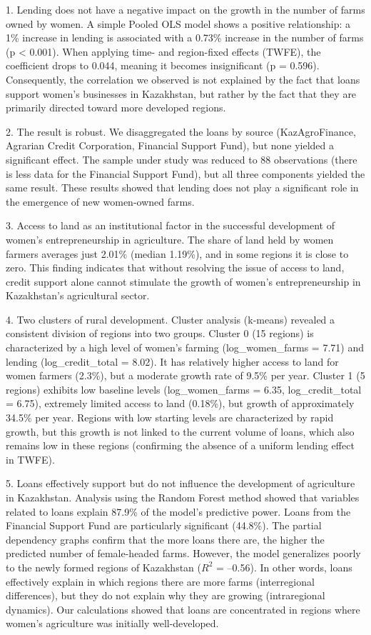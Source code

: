 ﻿\documentclass[sn-mathphys-num]{sn-jnl}
\begin{document}
1. Lending does not have a negative impact on the growth in the number
of farms owned by women. A simple Pooled OLS model shows a positive
relationship: a 1\% increase in lending is associated with a 0.73\%
increase in the number of farms (p \textless{} 0.001). When applying
time- and region-fixed effects (TWFE), the coefficient drops to 0.044,
meaning it becomes insignificant (p = 0.596). Consequently, the
correlation we observed is not explained by the fact that loans support
women's businesses in Kazakhstan, but rather by the fact that they are
primarily directed toward more developed regions.

2. The result is robust. We disaggregated the loans by source
(KazAgroFinance, Agrarian Credit Corporation, Financial Support Fund),
but none yielded a significant effect. The sample under study was
reduced to 88 observations (there is less data for the Financial Support
Fund), but all three components yielded the same result. These results
showed that lending does not play a significant role in the emergence of
new women-owned farms.

3. Access to land as an institutional factor in the successful
development of women's entrepreneurship in agriculture. The share of
land held by women farmers averages just 2.01\% (median 1.19\%), and in
some regions it is close to zero. This finding indicates that without
resolving the issue of access to land, credit support alone cannot
stimulate the growth of women's entrepreneurship in Kazakhstan's
agricultural sector.

4. Two clusters of rural development. Cluster analysis (k-means)
revealed a consistent division of regions into two groups. Cluster 0 (15
regions) is characterized by a high level of women's farming
(log\_women\_farms = 7.71) and lending (log\_credit\_total = 8.02). It
has relatively higher access to land for women farmers (2.3\%), but a
moderate growth rate of 9.5\% per year. Cluster 1 (5 regions) exhibits
low baseline levels (log\_women\_farms = 6.35, log\_credit\_total =
6.75), extremely limited access to land (0.18\%), but growth of
approximately 34.5\% per year. Regions with low starting levels are
characterized by rapid growth, but this growth is not linked to the
current volume of loans, which also remains low in these regions
(confirming the absence of a uniform lending effect in TWFE).

5. Loans effectively support but do not influence the development of
agriculture in Kazakhstan. Analysis using the Random Forest method
showed that variables related to loans explain 87.9\% of the model's
predictive power. Loans from the Financial Support Fund are particularly
significant (44.8\%). The partial dependency graphs confirm that the
more loans there are, the higher the predicted number of female-headed
farms. However, the model generalizes poorly to the newly formed regions
of Kazakhstan ($R^2$ = --0.56). In other words, loans effectively explain
in which regions there are more farms (interregional differences), but
they do not explain why they are growing (intraregional dynamics). Our
calculations showed that loans are concentrated in regions where women's
agriculture was initially well-developed.
\end{document}
